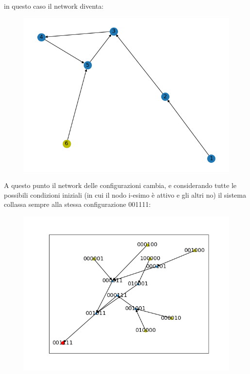 \documentclass[11pt]{article}
\begin{document}
in questo caso il network diventa:
\begin{figure}[ht!]
  \center
  \includegraphics[scale=0.5]{env.png}
  \label{fig:net}
\end{figure}

A questo punto il network delle configurazioni cambia, e considerando tutte le possibili condizioni iniziali (in cui il nodo i-esimo è attivo e gli altri no) il sistema collassa sempre alla stessa configurazione 001111:

\begin{figure}[ht!]
  \center
  \includegraphics[scale=0.5]{confenv.png}
  \label{fig:net}
\end{figure}
\end{document}
